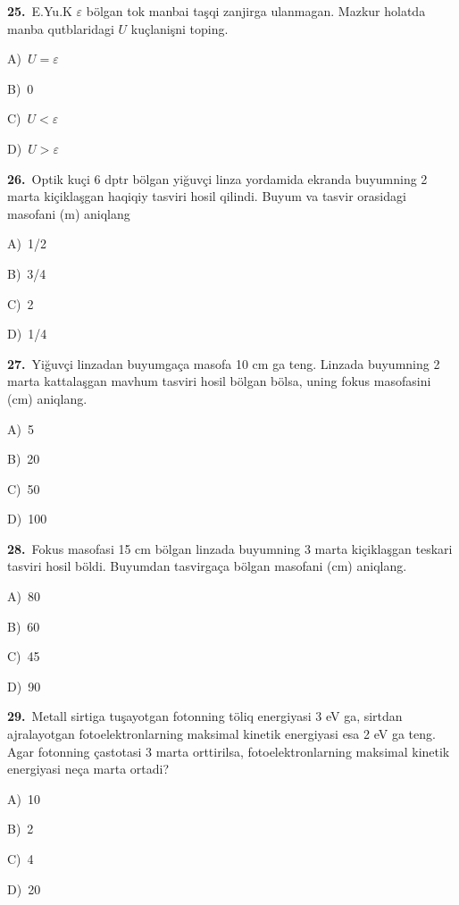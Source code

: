 \documentclass[11pt,a4paper]{article}
\newcommand{\opt}[2]{\hspace*{4mm}#1)\ #2\par}
\begin{document}
\noindent\begin{minipage}{\linewidth}
\textbf{25.}\ E.Yu.K $\varepsilon$ bölgan tok manbai taşqi zanjirga ulanmagan. Mazkur holatda manba qutblaridagi $U$ kuçlanişni toping.\par\smallskip
\opt{A}{$U=\varepsilon$}
\opt{B}{0}
\opt{C}{$U<\varepsilon$}
\opt{D}{$U>\varepsilon$}
\end{minipage}\vspace{9pt}\par
\noindent\begin{minipage}{\linewidth}
\textbf{26.}\ Optik kuçi 6 dptr bölgan yiğuvçi linza yordamida ekranda buyumning 2 marta kiçiklaşgan haqiqiy tasviri hosil qilindi. Buyum va tasvir orasidagi masofani (m) aniqlang\par\smallskip
\opt{A}{1/2}
\opt{B}{3/4}
\opt{C}{2}
\opt{D}{1/4}
\end{minipage}\vspace{9pt}\par
\noindent\begin{minipage}{\linewidth}
\textbf{27.}\ Yiğuvçi linzadan buyumgaça masofa 10 cm ga teng. Linzada buyumning 2 marta kattalaşgan mavhum tasviri hosil bölgan bölsa, uning fokus masofasini (cm) aniqlang.\par\smallskip
\opt{A}{5}
\opt{B}{20}
\opt{C}{50}
\opt{D}{100}
\end{minipage}\vspace{9pt}\par
\noindent\begin{minipage}{\linewidth}
\textbf{28.}\ Fokus masofasi 15 cm bölgan linzada buyumning 3 marta kiçiklaşgan teskari tasviri hosil böldi. Buyumdan tasvirgaça bölgan masofani (cm) aniqlang.\par\smallskip
\opt{A}{80}
\opt{B}{60}
\opt{C}{45}
\opt{D}{90}
\end{minipage}\vspace{9pt}\par
\noindent\begin{minipage}{\linewidth}
\textbf{29.}\ Metall sirtiga tuşayotgan fotonning töliq energiyasi 3 eV ga, sirtdan ajralayotgan fotoelektronlarning maksimal kinetik energiyasi esa 2 eV ga teng. Agar fotonning çastotasi 3 marta orttirilsa, fotoelektronlarning maksimal kinetik energiyasi neça marta ortadi?\par\smallskip
\opt{A}{10}
\opt{B}{2}
\opt{C}{4}
\opt{D}{20}
\end{minipage}\vspace{9pt}\par
\end{document}
